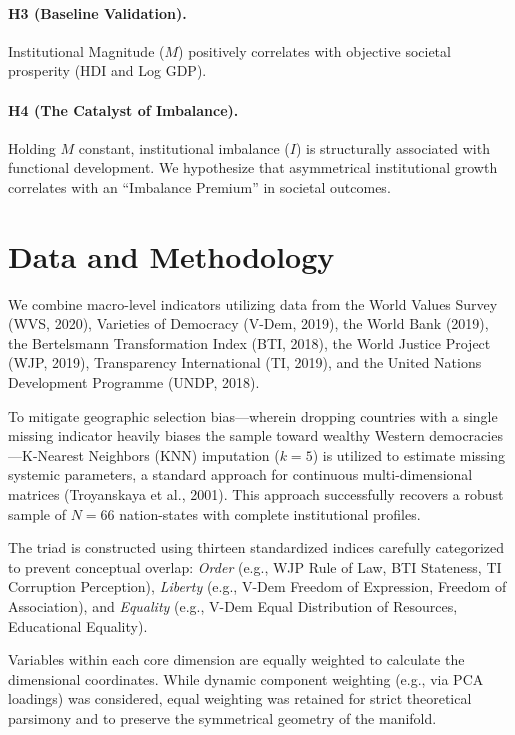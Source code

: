 \documentclass[12pt]{article}
\begin{document}
\paragraph{H3 (Baseline Validation).}
Institutional Magnitude ($M$) positively correlates with objective societal prosperity (HDI and Log GDP).

\paragraph{H4 (The Catalyst of Imbalance).}
Holding $M$ constant, institutional imbalance ($I$) is structurally associated with functional development. We hypothesize that asymmetrical institutional growth correlates with an ``Imbalance Premium'' in societal outcomes.

\section{Data and Methodology}

We combine macro-level indicators utilizing data from the World Values Survey (WVS, 2020), Varieties of Democracy (V-Dem, 2019), the World Bank (2019), the Bertelsmann Transformation Index (BTI, 2018), the World Justice Project (WJP, 2019), Transparency International (TI, 2019), and the United Nations Development Programme (UNDP, 2018).

To mitigate geographic selection bias—wherein dropping countries with a single missing indicator heavily biases the sample toward wealthy Western democracies—K-Nearest Neighbors (KNN) imputation ($k=5$) is utilized to estimate missing systemic parameters, a standard approach for continuous multi-dimensional matrices (Troyanskaya et al., 2001). This approach successfully recovers a robust sample of $N=66$ nation-states with complete institutional profiles.

The triad is constructed using thirteen standardized indices carefully categorized to prevent conceptual overlap: \textit{Order} (e.g., WJP Rule of Law, BTI Stateness, TI Corruption Perception), \textit{Liberty} (e.g., V-Dem Freedom of Expression, Freedom of Association), and \textit{Equality} (e.g., V-Dem Equal Distribution of Resources, Educational Equality).

Variables within each core dimension are equally weighted to calculate the dimensional coordinates. While dynamic component weighting (e.g., via PCA loadings) was considered, equal weighting was retained for strict theoretical parsimony and to preserve the symmetrical geometry of the manifold.
\end{document}
